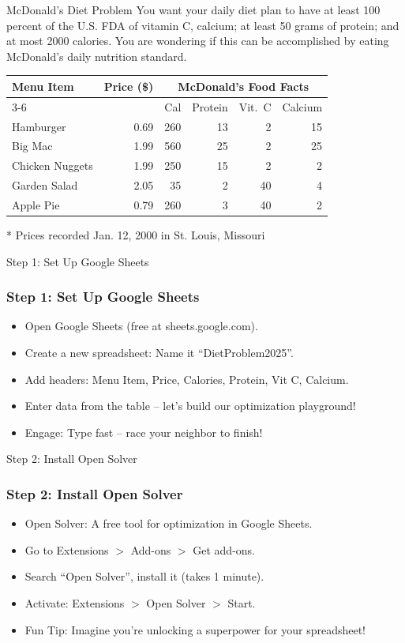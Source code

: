 \documentclass{beamer}
\begin{document}
\begin{frame}[shrink]{McDonald's Diet Problem}
You want your daily diet plan to have at least 100 percent of the U.S. FDA of vitamin C, calcium; at least 50 grams of protein; and at most 2000 calories. You are wondering if this can be accomplished by eating McDonald's daily nutrition standard.
\vspace{-5pt}
\begin{table}
\footnotesize
\begin{tabular}{p{40pt}rrrrr} %
\toprule
\multirow{2}{*}{Menu Item} & \multirow{2}{*}{Price (\$)} & \multicolumn{4}{c}{McDonald's Food Facts}\\ %
\cmidrule{3-6}
 &  & Cal & Protein & Vit.~C & Calcium \\
\midrule
Hamburger & 0.69 & 260 & 13 & 2 & 15 \\\hline
Big Mac & 1.99 & 560 & 25 & 2 & 25 \\\hline
Chicken Nuggets & 1.99 & 250 & 15 & 2 & 2 \\\hline
Garden Salad & 2.05 & 35 & 2 & 40 & 4 \\\hline 
Apple Pie & 0.79 & 260 & 3 & 40 & 2 \\
\bottomrule
\end{tabular}
\end{table}
\footnotesize{* Prices recorded Jan. 12, 2000 in St. Louis, Missouri}
\end{frame}

\begin{frame}{Step 1: Set Up Google Sheets}
\frametitle{Step 1: Set Up Google Sheets}
\begin{itemize}
  \item Open Google Sheets (free at sheets.google.com).
  \item Create a new spreadsheet: Name it ``DietProblem2025''.
  \item Add headers: Menu Item, Price, Calories, Protein, Vit C, Calcium.
  \item Enter data from the table – let’s build our optimization playground!
  \item Engage: Type fast – race your neighbor to finish!
\end{itemize}
\end{frame}

\begin{frame}{Step 2: Install Open Solver}
\frametitle{Step 2: Install Open Solver}
\begin{itemize}
  \item Open Solver: A free tool for optimization in Google Sheets.
  \item Go to Extensions \(>\) Add-ons \(>\) Get add-ons.
  \item Search ``Open Solver'', install it (takes 1 minute).
  \item Activate: Extensions \(>\) Open Solver \(>\) Start.
  \item Fun Tip: Imagine you’re unlocking a superpower for your spreadsheet!
\end{itemize}
\end{frame}
\end{document}
